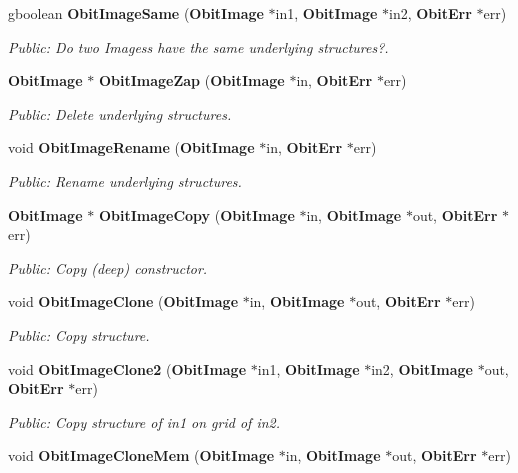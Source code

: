 \begin{CompactItemize}
gboolean {\bf Obit\-Image\-Same} ({\bf Obit\-Image} $\ast$in1, {\bf Obit\-Image} $\ast$in2, {\bf Obit\-Err} $\ast$err)
\begin{CompactList}\small\item\em Public: Do two Imagess have the same underlying structures?. \item\end{CompactList}\item 
{\bf Obit\-Image} $\ast$ {\bf Obit\-Image\-Zap} ({\bf Obit\-Image} $\ast$in, {\bf Obit\-Err} $\ast$err)
\begin{CompactList}\small\item\em Public: Delete underlying structures. \item\end{CompactList}\item 
void {\bf Obit\-Image\-Rename} ({\bf Obit\-Image} $\ast$in, {\bf Obit\-Err} $\ast$err)
\begin{CompactList}\small\item\em Public: Rename underlying structures. \item\end{CompactList}\item 
{\bf Obit\-Image} $\ast$ {\bf Obit\-Image\-Copy} ({\bf Obit\-Image} $\ast$in, {\bf Obit\-Image} $\ast$out, {\bf Obit\-Err} $\ast$err)
\begin{CompactList}\small\item\em Public: Copy (deep) constructor. \item\end{CompactList}\item 
void {\bf Obit\-Image\-Clone} ({\bf Obit\-Image} $\ast$in, {\bf Obit\-Image} $\ast$out, {\bf Obit\-Err} $\ast$err)
\begin{CompactList}\small\item\em Public: Copy structure. \item\end{CompactList}\item 
void {\bf Obit\-Image\-Clone2} ({\bf Obit\-Image} $\ast$in1, {\bf Obit\-Image} $\ast$in2, {\bf Obit\-Image} $\ast$out, {\bf Obit\-Err} $\ast$err)
\begin{CompactList}\small\item\em Public: Copy structure of in1 on grid of in2. \item\end{CompactList}\item 
void {\bf Obit\-Image\-Clone\-Mem} ({\bf Obit\-Image} $\ast$in, {\bf Obit\-Image} $\ast$out, {\bf Obit\-Err} $\ast$err)

\end{CompactItemize}
